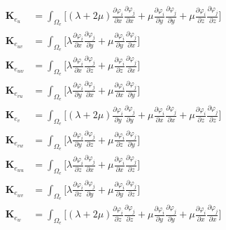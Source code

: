 \documentclass[12pt]{article}
\begin{document}
\begin{equation}		\label{eq50}
\begin{split}
\mathbf{K}_{e_u}&=\int_{\Omega_e}\Bigg[(\lambda+2\mu)\frac{\partial \varphi_i}{\partial x}\frac{\partial \varphi_j}{\partial x}+\mu\frac{\partial \varphi_i}{\partial y}\frac{\partial \varphi_j}{\partial y} + \mu\frac{\partial \varphi_i}{\partial z}\frac{\partial \varphi_j}{\partial z}\Bigg]	\\
%
\mathbf{K}_{e_{uv}}&=\int_{\Omega_e}\Bigg[\lambda\frac{\partial \varphi_i}{\partial x}\frac{\partial \varphi_j}{\partial y} + \mu\frac{\partial \varphi_i}{\partial y}\frac{\partial \varphi_j}{\partial x}\Bigg]	\\
%
\mathbf{K}_{e_{uw}}&= \int_{\Omega_e}\Bigg[\lambda\frac{\partial \varphi_i}{\partial x}\frac{\partial \varphi_j}{\partial z} +\mu\frac{\partial \varphi_i}{\partial z}\frac{\partial \varphi_j}{\partial x}\Bigg]	\\
%
\mathbf{K}_{e_{vu}}&= \int_{\Omega_e}\Bigg[\lambda\frac{\partial \varphi_i}{\partial y}\frac{\partial \varphi_j}{\partial x}+\mu\frac{\partial \varphi_i}{\partial x}\frac{\partial \varphi_j}{\partial y}\Bigg] 		\\
%
\mathbf{K}_{e_{v}}&=\int_{\Omega_e}\Bigg[(\lambda+2\mu)\frac{\partial \varphi_i}{\partial y}\frac{\partial \varphi_j}{\partial y}+\mu\frac{\partial \varphi_i}{\partial x}\frac{\partial \varphi_j}{\partial x} + \mu\frac{\partial \varphi_i}{\partial z}\frac{\partial \varphi_j}{\partial z}\Bigg]		\\
%
\mathbf{K}_{e_{vw}}&=\int_{\Omega_e}\Bigg[\lambda\frac{\partial \varphi_i}{\partial y}\frac{\partial \varphi_j}{\partial z}+\mu\frac{\partial \varphi_i}{\partial z}\frac{\partial \varphi_j}{\partial y}\Bigg] 		\\
%
\mathbf{K}_{e_{wu}}&=\int_{\Omega_e}\Bigg[\lambda\frac{\partial \varphi_i}{\partial z}\frac{\partial \varphi_j}{\partial x} +\mu\frac{\partial \varphi_i}{\partial x}\frac{\partial \varphi_j}{\partial z}\Bigg] 		\\
%
\mathbf{K}_{e_{wv}}&=\int_{\Omega_e}\Bigg[\lambda\frac{\partial \varphi_i}{\partial z}\frac{\partial \varphi_j}{\partial y}+\mu\frac{\partial \varphi_i}{\partial y}\frac{\partial \varphi_j}{\partial z}\Bigg] 		\\
%
\mathbf{K}_{e_{w}}&=\int_{\Omega_e}\Bigg[(\lambda+2\mu)\frac{\partial \varphi_i}{\partial z}\frac{\partial \varphi_j}{\partial z}+\mu\frac{\partial \varphi_i}{\partial y}\frac{\partial \varphi_j}{\partial y} + \mu\frac{\partial \varphi_i}{\partial x}\frac{\partial \varphi_j}{\partial x}\Bigg]
\end{split}
\end{equation}
\end{document}
